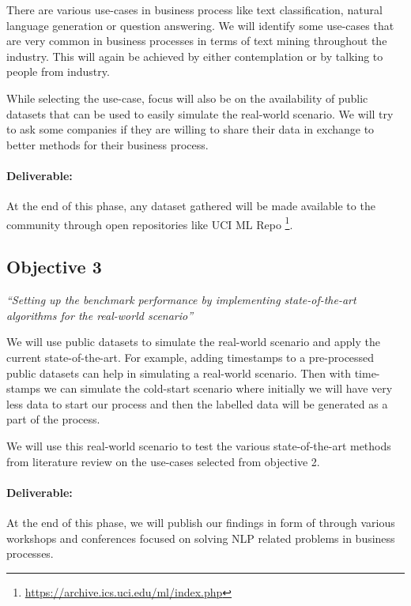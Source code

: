 \vspace{12pt}
\noindent There are various use-cases in business process like text classification, natural language generation or question answering. We will identify some use-cases that are very common in business processes in terms of text mining throughout the industry. This will again be achieved by either contemplation or by talking to people from industry.

While selecting the use-case, focus will also be on the availability of public datasets that can be used to easily simulate the real-world scenario. We will try to ask some companies if they are willing to share their data in exchange to better methods for their business process.

\paragraph{Deliverable:} At the end of this phase, any dataset gathered will be made available to the community through open repositories like UCI ML Repo \footnote{\url{https://archive.ics.uci.edu/ml/index.php}}.

\subsection{Objective 3}
\textit{``Setting up the benchmark performance by implementing state-of-the-art algorithms for the real-world scenario''}

\vspace{12pt}

\noindent We will use public datasets to simulate the real-world scenario and apply the current state-of-the-art. For example, adding timestamps to a pre-processed public datasets can help in simulating a real-world scenario. Then with time-stamps we can simulate the cold-start scenario where initially we will have very less data to start our process and then the labelled data will be generated as a part of the process. 

We will use this real-world scenario to test the various state-of-the-art methods from literature review on the use-cases selected from objective 2. 

\paragraph{Deliverable:} At the end of this phase, we will publish our findings in form of through various workshops and conferences focused on solving NLP related problems in business processes.

